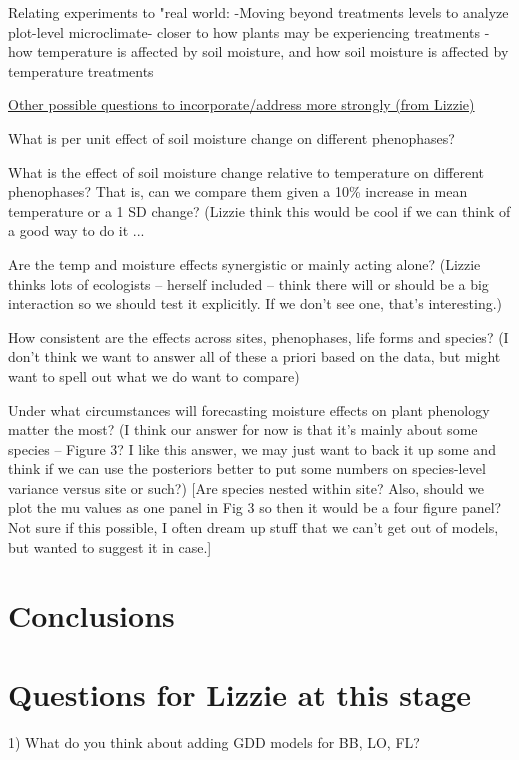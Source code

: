 \documentclass{article}
\begin{document}
\par Relating experiments to "real world:
    -Moving beyond treatments levels to analyze plot-level microclimate- closer to how plants may be experiencing treatments
    -how temperature is affected by soil moisture, and how soil moisture is affected by temperature treatments
\par \underline{Other possible questions to incorporate/address more strongly (from Lizzie)}
\par What is per unit effect of soil moisture change on different phenophases? 
\par What is the effect of soil moisture change relative to temperature on different phenophases? That is, can we compare them given a 10\% increase in mean temperature or a 1 SD change? (Lizzie think this would be cool if we can think of a good way to do it ... 
\par Are the temp and moisture effects synergistic or mainly acting alone? (Lizzie thinks lots of ecologists -- herself included -- think there will or should be a big interaction so we should test it explicitly. If we don't see one, that's interesting.)
\par How consistent are the effects across sites, phenophases, life forms and species? (I don't think we want to answer all of these a priori based on the data, but might want to spell out what we do want to compare)
\par Under what circumstances will forecasting moisture effects on plant phenology matter the most? (I think our answer for now is that it's mainly about some species -- Figure 3? I like this answer, we may just want to back it up some and think if we can use the posteriors better to put some numbers on species-level variance versus site or such?) [Are species nested within site? Also, should we plot the mu values as one panel in Fig 3 so then it would be a four figure panel? Not sure if this possible, I often dream up stuff that we can't get out of models, but wanted to suggest it in case.]


\section* {Conclusions}

\section* {Questions for Lizzie at this stage}

1) What do you think about adding GDD models for BB, LO, FL? %
\end{document}
